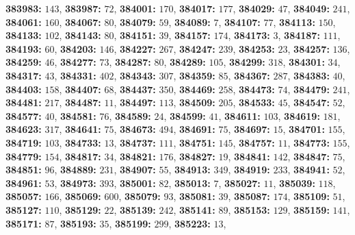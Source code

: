 \textsf{\bfseries 383983:} $143$, \textsf{\bfseries 383987:} $72$, \textsf{\bfseries 384001:} $170$, \textsf{\bfseries 384017:} $177$, \textsf{\bfseries 384029:} $47$, \textsf{\bfseries 384049:} $241$, \textsf{\bfseries 384061:} $160$, \textsf{\bfseries 384067:} $80$, \textsf{\bfseries 384079:} $59$, \textsf{\bfseries 384089:} $7$, \textsf{\bfseries 384107:} $77$, \textsf{\bfseries 384113:} $150$, \textsf{\bfseries 384133:} $102$, \textsf{\bfseries 384143:} $80$, \textsf{\bfseries 384151:} $39$, \textsf{\bfseries 384157:} $174$, \textsf{\bfseries 384173:} $3$, \textsf{\bfseries 384187:} $111$, \textsf{\bfseries 384193:} $60$, \textsf{\bfseries 384203:} $146$, \textsf{\bfseries 384227:} $267$, \textsf{\bfseries 384247:} $239$, \textsf{\bfseries 384253:} $23$, \textsf{\bfseries 384257:} $136$, \textsf{\bfseries 384259:} $46$, \textsf{\bfseries 384277:} $73$, \textsf{\bfseries 384287:} $80$, \textsf{\bfseries 384289:} $105$, \textsf{\bfseries 384299:} $318$, \textsf{\bfseries 384301:} $34$, \textsf{\bfseries 384317:} $43$, \textsf{\bfseries 384331:} $402$, \textsf{\bfseries 384343:} $307$, \textsf{\bfseries 384359:} $85$, \textsf{\bfseries 384367:} $287$, \textsf{\bfseries 384383:} $40$, \textsf{\bfseries 384403:} $158$, \textsf{\bfseries 384407:} $68$, \textsf{\bfseries 384437:} $350$, \textsf{\bfseries 384469:} $258$, \textsf{\bfseries 384473:} $74$, \textsf{\bfseries 384479:} $241$, \textsf{\bfseries 384481:} $217$, \textsf{\bfseries 384487:} $11$, \textsf{\bfseries 384497:} $113$, \textsf{\bfseries 384509:} $205$, \textsf{\bfseries 384533:} $45$, \textsf{\bfseries 384547:} $52$, \textsf{\bfseries 384577:} $40$, \textsf{\bfseries 384581:} $76$, \textsf{\bfseries 384589:} $24$, \textsf{\bfseries 384599:} $41$, \textsf{\bfseries 384611:} $103$, \textsf{\bfseries 384619:} $181$, \textsf{\bfseries 384623:} $317$, \textsf{\bfseries 384641:} $75$, \textsf{\bfseries 384673:} $494$, \textsf{\bfseries 384691:} $75$, \textsf{\bfseries 384697:} $15$, \textsf{\bfseries 384701:} $155$, \textsf{\bfseries 384719:} $103$, \textsf{\bfseries 384733:} $13$, \textsf{\bfseries 384737:} $111$, \textsf{\bfseries 384751:} $145$, \textsf{\bfseries 384757:} $11$, \textsf{\bfseries 384773:} $155$, \textsf{\bfseries 384779:} $154$, \textsf{\bfseries 384817:} $34$, \textsf{\bfseries 384821:} $176$, \textsf{\bfseries 384827:} $19$, \textsf{\bfseries 384841:} $142$, \textsf{\bfseries 384847:} $75$, \textsf{\bfseries 384851:} $96$, \textsf{\bfseries 384889:} $231$, \textsf{\bfseries 384907:} $55$, \textsf{\bfseries 384913:} $349$, \textsf{\bfseries 384919:} $233$, \textsf{\bfseries 384941:} $52$, \textsf{\bfseries 384961:} $53$, \textsf{\bfseries 384973:} $393$, \textsf{\bfseries 385001:} $82$, \textsf{\bfseries 385013:} $7$, \textsf{\bfseries 385027:} $11$, \textsf{\bfseries 385039:} $118$, \textsf{\bfseries 385057:} $166$, \textsf{\bfseries 385069:} $600$, \textsf{\bfseries 385079:} $93$, \textsf{\bfseries 385081:} $39$, \textsf{\bfseries 385087:} $174$, \textsf{\bfseries 385109:} $51$, \textsf{\bfseries 385127:} $110$, \textsf{\bfseries 385129:} $22$, \textsf{\bfseries 385139:} $242$, \textsf{\bfseries 385141:} $89$, \textsf{\bfseries 385153:} $129$, \textsf{\bfseries 385159:} $141$, \textsf{\bfseries 385171:} $87$, \textsf{\bfseries 385193:} $35$, \textsf{\bfseries 385199:} $299$, \textsf{\bfseries 385223:} $13$, 
